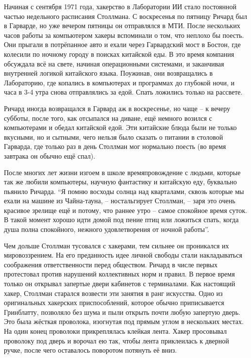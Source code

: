 Начиная с сентября 1971 года, хакерство в Лаборатории ИИ стало постоянной частью недельного расписания Столлмана. С воскресенья по пятницу Ричард был в Гарварде, но уже вечером пятницы он отправлялся в МТИ. После нескольких часов работы за компьютером хакеры вспоминали о том, что неплохо бы поесть. Они прыгали в потрёпанное авто и ехали через Гарвардский мост в Бостон, где колесили по ночному городу в поисках китайской еды. В это время компания обсуждала всё на свете, начиная операционными системами, и заканчивая внутренней логикой китайского языка. Поужинав, они возвращались в Лабораторию, где копались в компьютерах и программах до глубокой ночи, и часа в 3-4 утра снова отправлялись за едой. Спать ложились только на рассвете.

Ричард иногда возвращался в Гарвард аж в воскресенье, но чаще -- к вечеру субботы, после того, как отсыпался на диване, ещё немного возился с компьютерами и обедал китайской едой. Эти китайские блюда были не только вкусными, но и сытными, чего нельзя было сказать о питании в столовой Гарварда, где только раз в день Столлман мог нормально поесть (во время завтрака он обычно ещё спал).

После многих лет жизни изгоем в школе времяпровождение с людьми, которые так же любили компьютеры, научную фантастику и китайскую еду, буквально пьянило Ричарда. \enquote{Я помню восходы солнца над кварталами, сквозь которые мы ехали на машине из Чайна-тауна, -- ностальгирует Столлман, -- заря это очень красивое зрелище ещё и потому, что раннее утро -- самое спокойное время суток. В такой момент хорошо идти домой под пение птиц или ложиться спать, когда душа полна спокойного, нежного удовлетворения от ночной работы}.

Чем дольше Столлман тусовался с хакерами, тем сильнее он проникался их мировоззрением. На его преданность идее личной свободы стали накладываться соображения ответственности перед обществом. Ричард в числе первых протестовал против нарушений коллективных норм и правил. В первое время только он открывал запертые двери кабинетов с терминалами. Как настоящий хакер, Столлман старался возвести эти занятия в ранг искусства. Одно из оригинальных хакерских приспособлений, которое обычно приписывается Гринблатту, позволяло без шума и пыли открыть почти любую запертую дверь. Это была жёсткая проволока, изогнутая под прямым углом в нескольких местах. На один конец проволоки прикреплялась клейкая лента. Хакер просовывал проволоку под дверь и ворочал ею так, чтобы лента приклеилась к дверной ручке, после чего оставалось поворотом потянуть её вниз.

